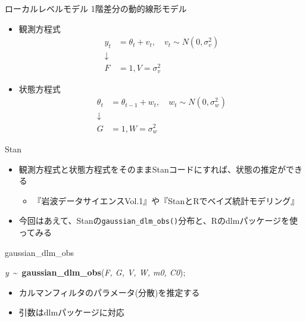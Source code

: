 \documentclass[dvipdfmx,12pt]{beamer}
\begin{document}
\begin{frame}{ローカルレベルモデル}
  1階差分の動的線形モデル

  \begin{itemize}
  \item 観測方程式
    \begin{align*}
      y_{t} &= \theta_{t} + v_{t}, \quad v_{t} \sim N(0, \sigma_{v}^2) \\
      \downarrow \\
      F &= 1, V = \sigma_{v}^2
    \end{align*}

  \item 状態方程式
    \begin{align*}
      \theta_{t} &= \theta_{t-1} + w_{t}, \quad w_{t} \sim N(0, \sigma_{w}^2) \\
      \downarrow \\
      G &= 1, W = \sigma_{w}^2
    \end{align*}
  \end{itemize}
\end{frame}

\begin{frame}{Stan}
  \begin{itemize}
  \item 観測方程式と状態方程式をそのまま\textsf{Stan}コードにすれば、状態の推定ができる
    \begin{itemize}
    \item 『岩波データサイエンスVol.1』や『StanとRでベイズ統計モデリング』
    \end{itemize}
  \item 今回はあえて、\textsf{Stan}の\texttt{gaussian\_dlm\_obs()}分布と、\textsf{R}の\textsf{dlm}パッケージを使ってみる
  \end{itemize}
\end{frame}

\begin{frame}{gaussian\_dlm\_obs}

  \textit{y}~\textasciitilde~\textbf{gaussian\_dlm\_obs}(\textit{F, G, V, W, m0, C0});

  \begin{itemize}
  \item カルマンフィルタのパラメータ(分散)を推定する
  \item 引数は\textsf{dlm}パッケージに対応
  \end{itemize}
\end{frame}
\end{document}
